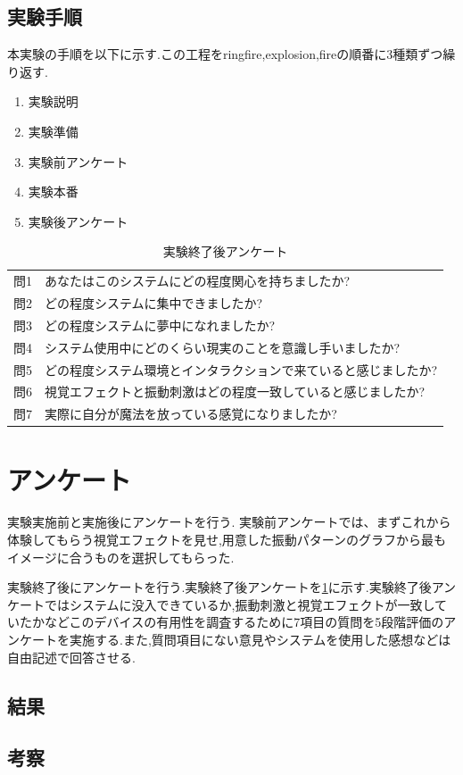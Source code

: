 \subsection{実験手順}
本実験の手順を以下に示す.この工程をringfire,explosion,fireの順番に3種類ずつ繰り返す.
\begin{enumerate}
    \item 実験説明
    \item 実験準備
    \item 実験前アンケート
    \item 実験本番
    \item 実験後アンケート
\end{enumerate}






\begin{table}[htbp]
    \centering
    \caption{実験終了後アンケート}
    \label{tab:後}
    {\renewcommand\arraystretch{1.2}}
    \begin{tabular}{l|l}
        \hline \hline
        問1 & あなたはこのシステムにどの程度関心を持ちましたか?\\
         問2 & どの程度システムに集中できましたか?\\
         問3 & どの程度システムに夢中になれましたか?\\
         問4 & システム使用中にどのくらい現実のことを意識し手いましたか?\\
         問5 & どの程度システム環境とインタラクションで来ていると感じましたか?\\
         問6 & 視覚エフェクトと振動刺激はどの程度一致していると感じましたか?\\
         問7 & 実際に自分が魔法を放っている感覚になりましたか?\\
         \hline
         
    \end{tabular}
\end{table}

\section{アンケート}
実験実施前と実施後にアンケートを行う.
実験前アンケートでは、まずこれから体験してもらう視覚エフェクトを見せ,用意した振動パターンのグラフから最もイメージに合うものを選択してもらった.

実験終了後にアンケートを行う.実験終了後アンケートを\ref{tab:後}に示す.実験終了後アンケートではシステムに没入できているか,振動刺激と視覚エフェクトが一致していたかなどこのデバイスの有用性を調査するために7項目の質問を5段階評価のアンケートを実施する.また,質問項目にない意見やシステムを使用した感想などは自由記述で回答させる.

\subsection{結果}
\subsection{考察}
